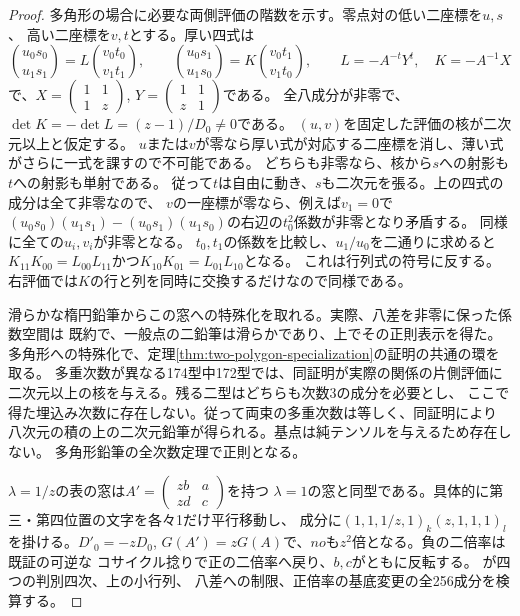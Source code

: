 \begin{proof}
多角形の場合に必要な両側評価の階数を示す。零点対の低い二座標を$u,s$、
高い二座標を$v,t$とする。厚い四式は
\[
 \binom{u_0s_0}{u_1s_1}=L\binom{v_0t_0}{v_1t_1},\qquad
 \binom{u_0s_1}{u_1s_0}=K\binom{v_0t_1}{v_1t_0},\qquad
 L=-A^{-t}Y^t,\quad K=-A^{-1}X
\]
で、$X=\left(\begin{smallmatrix}1&1\\1&z\end{smallmatrix}\right)$,
$Y=\left(\begin{smallmatrix}1&1\\z&1\end{smallmatrix}\right)$である。
全八成分が非零で、$\det K=-\det L=(z-1)/D_0\ne0$である。
$(u,v)$を固定した評価の核が二次元以上と仮定する。
$u$または$v$が零なら厚い式が対応する二座標を消し、薄い式がさらに一式を課すので不可能である。
どちらも非零なら、核から$s$への射影も$t$への射影も単射である。
従って$t$は自由に動き、$s$も二次元を張る。上の四式の成分は全て非零なので、
$v$の一座標が零なら、例えば$v_1=0$で
$(u_0s_0)(u_1s_1)-(u_0s_1)(u_1s_0)$の右辺の$t_0^2$係数が非零となり矛盾する。
同様に全ての$u_i,v_i$が非零となる。
$t_0,t_1$の係数を比較し、$u_1/u_0$を二通りに求めると
$K_{11}K_{00}=L_{00}L_{11}$かつ$K_{10}K_{01}=L_{01}L_{10}$となる。
これは行列式の符号に反する。右評価では$K$の行と列を同時に交換するだけなので同様である。

滑らかな楕円鉛筆からこの窓への特殊化を取れる。実際、八差を非零に保った係数空間は
既約で、一般点の二鉛筆は滑らかであり、上でその正則表示を得た。
多角形への特殊化で、定理\ref{thm:two-polygon-specialization}の証明の共通の環を取る。
多重次数が異なる174型中172型では、同証明が実際の関係の片側評価に
二次元以上の核を与える。残る二型はどちらも次数3の成分を必要とし、
ここで得た埋込み次数に存在しない。従って両束の多重次数は等しく、同証明により
八次元の積の上の二次元鉛筆が得られる。基点は純テンソルを与えるため存在しない。
多角形鉛筆の全次数定理で正則となる。

$\lambda=1/z$の表の窓は$A'=\left(\begin{smallmatrix}zb&a\\zd&c\end{smallmatrix}\right)$を持つ
$\lambda=1$の窓と同型である。具体的に第三・第四位置の文字を各々1だけ平行移動し、
成分に$(1,1,1/z,1)_k(z,1,1,1)_l$を掛ける。$D'_0=-zD_0$,
$G(A')=zG(A)$で、$no$も$z^2$倍となる。負の二倍率は既証の可逆な
コサイクル捻りで正の二倍率へ戻り、$b,c$がともに反転する。
が四つの判別四次、上の小行列、
八差への制限、正倍率の基底変更の全256成分を検算する。
\end{proof}
